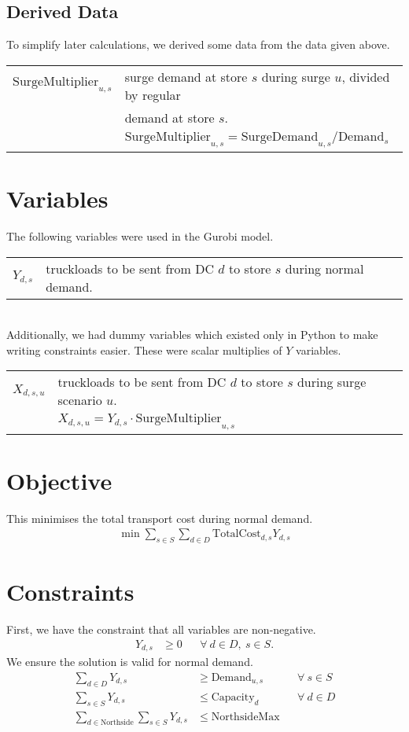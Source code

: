 \documentclass[11pt,a4paper]{article}
\begin{document}
\subsection{Derived Data}
To simplify later calculations, we derived some data from the data given above.\\[0.8em]    
\begin{tabular}{l l}
    $\mathrm{SurgeMultiplier}_{u,s}$ & surge demand at store $s$ during surge $u$,  divided by regular \\ 
    &  demand at store $s$. \\ 
    &$\mathrm{SurgeMultiplier}_{u,s} = \mathrm{SurgeDemand}_{u,s} / \mathrm{Demand}_s $
\end{tabular}

\section{Variables}
The following variables were used in the Gurobi model.\\[0.8em]
\begin{tabular}{l l}
    $Y_{d,s}$ & truckloads to be sent from DC $d$ to store $s$ during normal demand.
\end{tabular}
\\[0.8em]
\noindent Additionally, we had dummy variables which existed only in Python to 
make writing constraints easier. These were scalar multiplies of $Y$ variables.\\[0.8em]
\begin{tabular}{l l}
    $X_{d,s,u}$ & truckloads to be sent from DC $d$ to store $s$ during 
    surge scenario $u$. \\ 
    & $X_{d,s,u} = Y_{d,s} \cdot \mathrm{SurgeMultiplier}_{u,s}$
\end{tabular}

\section{Objective}
This minimises the total transport cost during normal demand.
\begin{align*}
    \min \sum_{s \in S} \sum_{d \in D} \mathrm{TotalCost}_{d, s} Y_{d,s}
\end{align*}

\section{Constraints}
First, we have the constraint that all variables are non-negative.
\begin{align*}
    Y_{d,s} &\ge 0 &&\forall~d \in D,~s \in S.
\end{align*}
We ensure the solution is valid for normal demand.
\begin{align*}
    \sum_{d \in D} Y_{d,s} &\ge \mathrm{Demand}_{u,s} &&\forall~s \in S \\ 
    \sum_{s \in S} Y_{d,s} &\le \mathrm{Capacity}_d &&\forall~d \in D \\ 
    \sum_{d \in \mathrm{Northside}} \sum_{s \in S} Y_{d,s} &\le \mathrm{NorthsideMax}
\end{align*}
\end{document}
